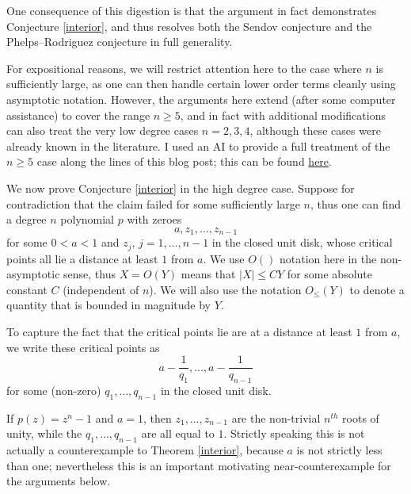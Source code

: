 \documentclass[12pt]{article}
\begin{document}
One consequence of this digestion is that the argument in fact demonstrates Conjecture \ref{interior}, and thus resolves both the Sendov conjecture and the Phelps--Rodriguez conjecture in full generality.  

For expositional reasons, we will restrict attention here to the case where $n$ is sufficiently large, as one can then handle certain lower order terms cleanly using asymptotic notation.  However, the arguments here extend (after some computer assistance) to cover the range $n \geq 5$, and in fact with additional modifications can also treat the very low degree cases $n=2,3,4$, although these cases were already known in the literature.  I used an AI to provide a full treatment of the $n \geq 5$ case along the lines of this blog post; this can be found \href{???}{here}.

We now prove Conjecture \ref{interior} in the high degree case.  Suppose for contradiction that the claim failed for some sufficiently large $n$, thus one can find a degree $n$ polynomial $p$ with zeroes
$$ a, z_1, \dots,z_{n-1}$$
for some $0 < a  < 1$ and $z_j$, $j=1,\dots,n-1$ in the closed unit disk, whose critical points all lie a distance at least $1$ from $a$.  We use $O()$ notation here in the non-asymptotic sense, thus $X = O(Y)$ means that $|X| \leq C Y$ for some absolute constant $C$ (independent of $n$).  We will also use the notation $O_{\leq}(Y)$ to denote a quantity that is bounded in magnitude by $Y$.

To capture the fact that the critical points lie are at a distance at least $1$ from $a$, we write these critical points as
$$ a - \frac{1}{q_1}, \dots, a - \frac{1}{q_{n-1}}$$
for some (non-zero) $q_1,\dots,q_{n-1}$ in the closed unit disk.

\begin{example}\label{ex}  If $p(z) = z^n - 1$ and $a=1$, then $z_1,\dots,z_{n-1}$ are the non-trivial $n^{th}$ roots of unity, while the $q_1,\dots,q_{n-1}$ are all equal to $1$.  Strictly speaking this is not actually a counterexample to Theorem \ref{interior}, because $a$ is not strictly less than one; nevertheless this is an important motivating near-counterexample for the arguments below.
\end{example}
\end{document}
